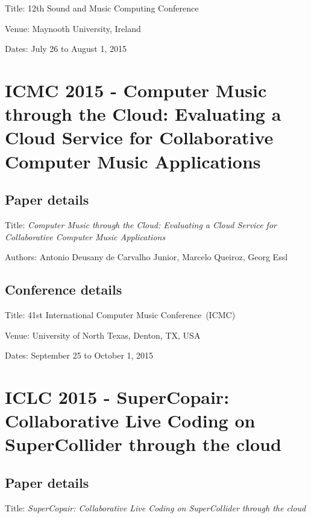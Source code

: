 Title: 12th Sound and Music Computing Conference

Venue: Maynooth University, Ireland

Dates: July 26 to August 1, 2015




\section{ICMC 2015 - Computer Music through the Cloud: Evaluating a Cloud Service for Collaborative Computer Music Applications}
\label{ape:papericmc2015}

\subsection*{Paper details}

Title: \textit{Computer Music through the Cloud: Evaluating a Cloud Service for Collaborative Computer Music Applications}

Authors: Antonio Deusany de Carvalho Junior, Marcelo Queiroz, Georg Essl

\subsection*{Conference details}

Title: 41st International Computer Music Conference~(ICMC)

Venue: University of North Texas, Denton, TX, USA

Dates: September 25 to October 1, 2015



\section{ICLC 2015 - SuperCopair: Collaborative Live Coding on SuperCollider through the cloud}
\label{ape:papericlc2015}

\subsection*{Paper details}

Title: \textit{SuperCopair: Collaborative Live Coding on SuperCollider through the cloud}

